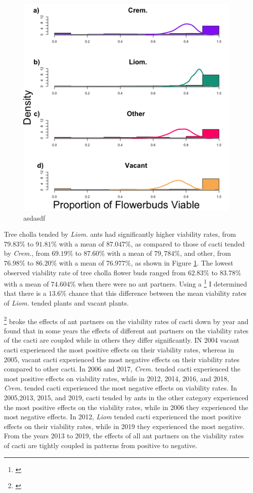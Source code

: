 \documentclass[12pt,a4paper]{article}
\newcommand{\tom}[2]{{\color{red}{#1}}\footnote{\textit{\color{red}{#2}}}}
\begin{document}
		\begin{figure}[h]
			\includegraphics[width=0.58\linewidth]{Viability.png}
			\caption{asdasdf}
			\label{fig:viab}
		\end{figure}
		
		Tree cholla tended by \textit{Liom.} ants had significantly higher viability rates, from $79.83\%$ to $91.81\%$ with a mean of $87.047\%$, as compared to those of cacti tended by \textit{Crem.}, from $69.19\%$ to $87.60\%$ with a mean of $79,784\%$, and other, from $76.98\%$ to $86.20\%$ with a mean of $76.977\%$, as shown in Figure \ref{fig:viab}. 
		The lowest observed viability rate of tree cholla flower buds ranged from $62.83\%$ to $83.78\%$ with a mean of $74.604\%$ when there were no ant partners. 
		Using a \tom{chi squared test}{I did not know you did this but i don't think you should} I determined that there is a $13.6\%$ chance that this difference between the mean viability rates of \textit{Liom.} tended plants and vacant plants. 
		
		\tom{We}{I think you need to re-think these paragraphs describing the time series, because I don't think you have given readers enough info to interpret these.} broke the effects of ant partners on the viability rates of cacti down by year and found that in some years the effects of different ant partners on the viability rates of the cacti are coupled while in others they differ significantly. 
		IN 2004 vacant cacti experienced the most positive effects on their viability rates, whereas in 2005, vacant cacti experienced the most negative effects on their viability rates compared to other cacti. 
		In 2006 and 2017, \textit{Crem.} tended cacti experienced the most positive effects on viability rates, while in 2012, 2014, 2016, and 2018, \textit{Crem.} tended cacti experienced the most negative effects on viability rates. 
		In 2005,2013, 2015, and 2019, cacti tended by ants in the other category experienced the most positive effects on the viability rates, while in 2006 they experienced the most negative effects. 
		In 2012, \textit{Liom} tended cacti experienced the most positive effects on their viability rates, while in 2019 they experienced the most negative. 
		From the years 2013 to 2019, the effects of all ant partners on the viability rates of cacti are tightly coupled in patterns from positive to negative. 
		
\end{document}
